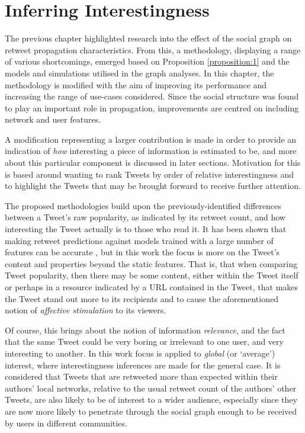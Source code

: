 \chapter{Inferring Interestingness}

The previous chapter highlighted research into the effect of the social graph on retweet propagation characteristics. From this, a methodology, displaying a range of various shortcomings, emerged based on Proposition \ref{proposition:1} and the models and simulations utilised in the graph analyses. In this chapter, the methodology is modified with the aim of improving its performance and increasing the range of use-cases considered. Since the social structure was found to play an important role in propagation, improvements are centred on including network and user features.

A modification representing a larger contribution is made in order to provide an indication of \textit{how} interesting a piece of information is estimated to be, and more about this particular component is discussed in later sections. Motivation for this is based around wanting to rank Tweets by order of relative interestingness and to highlight the Tweets that may be brought forward to receive further attention.

The proposed methodologies build upon the previously-identified differences between a Tweet's raw popularity, as indicated by its retweet count, and how interesting the Tweet actually is to those who read it. It has been shown that making retweet predictions against models trained with a large number of features can be accurate \cite{zhu11}, but in this work the focus is more on the Tweet's content and properties beyond the static features. That is, that when comparing Tweet popularity, then there may be some content, either within the Tweet itself or perhaps in a resource indicated by a URL contained in the Tweet, that makes the Tweet stand out more to its recipients and to cause the aforementioned notion of \textit{affective stimulation} \cite{xu07} to its viewers.

Of course, this brings about the notion of information \textit{relevance}, and the fact that the same Tweet could be very boring or irrelevant to one user, and very interesting to another. In this work focus is applied to \textit{global} (or `average') interest, where interestingness inferences are made for the general case. It is considered that Tweets that are retweeted more than expected within their authors' local networks, relative to the usual retweet count of the authors' other Tweets, are also likely to be of interest to a wider audience, especially since they are now more likely to penetrate through the social graph enough to be received by users in different communities.
 
